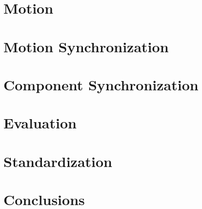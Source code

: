 \documentclass[graybox]{svmult}
\begin{document}
\section{Motion}
\label{sec:motion}


\section{Motion Synchronization}
\label{sec:motionsync}


\section{Component Synchronization}
\label{sec:compsync}


\section{Evaluation}
\label{sec:eval}


\section{Standardization}
\label{sec:standard}


\section{Conclusions}
\label{sec:concl}



 
\end{document}
